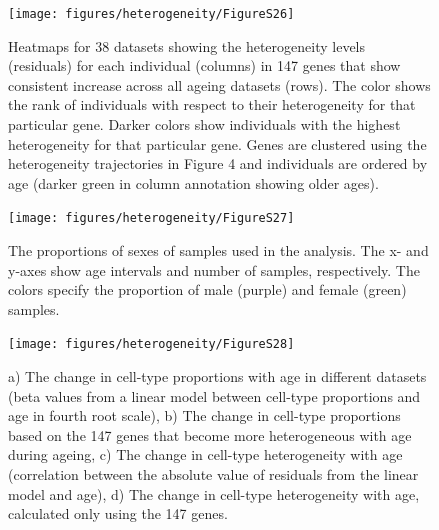 \documentclass[12pt,twoside]{unicam}
\begin{document}
\begin{figure}

{\centering \texttt{[image: figures/heterogeneity/FigureS26]} 

}

\caption[Heatmaps for 38 datasets showing the heterogeneity levels for each individualin 147 genes that show consistent increase across all ageing datasets.]{Heatmaps for 38 datasets showing the heterogeneity levels (residuals) for each individual (columns) in 147 genes that show consistent increase across all ageing datasets (rows). The color shows the rank of individuals with respect to their heterogeneity for that particular gene. Darker colors show individuals with the highest heterogeneity for that particular gene. Genes are clustered using the heterogeneity trajectories in Figure 4 and individuals are ordered by age (darker green in column annotation showing older ages).  }\label{fig:hetFigS26}
\end{figure}

\begin{figure}

{\centering \texttt{[image: figures/heterogeneity/FigureS27]} 

}

\caption[The proportions of sexes of samples used in the analysis.]{The proportions of sexes of samples used in the analysis. The x- and y-axes show age intervals and number of samples, respectively. The colors specify the proportion of male (purple) and female (green) samples.}\label{fig:hetFigS27}
\end{figure}

\begin{figure}

{\centering \texttt{[image: figures/heterogeneity/FigureS28]} 

}

\caption[The change in cell-type proportions and heterogeneities with age in different datasets.]{a) The change in cell-type proportions with age in different datasets (beta values from a linear model between cell-type proportions and age in fourth root scale), b) The change in cell-type proportions based on the 147 genes that become more heterogeneous with age during ageing, c) The change in cell-type heterogeneity with age (correlation between the absolute value of residuals from the linear model and age), d) The change in cell-type heterogeneity with age, calculated only using the 147 genes.}\label{fig:hetFigS28}
\end{figure}
\end{document}
